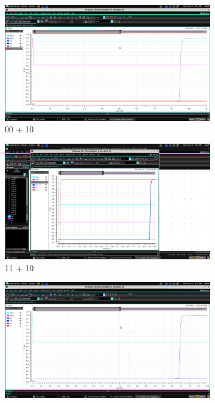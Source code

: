 \begin{figure}[H]
\begin{center}
\begin{subfigure}{0.4\textwidth}
\includegraphics[width=\textwidth]{chapters/chapter04/add_00+10.png}
\caption{ 00 + 10 }
\end{subfigure}
\begin{subfigure}{0.4\textwidth}
\includegraphics[width=\textwidth]{chapters/chapter04/add_11+10.png}
\caption{ 11 + 10 }
\end{subfigure}
\begin{subfigure}{0.4\textwidth}
\includegraphics[width=\textwidth]{chapters/chapter04/add_10+01.png}

\end{subfigure}
\end{center}
\end{figure}
